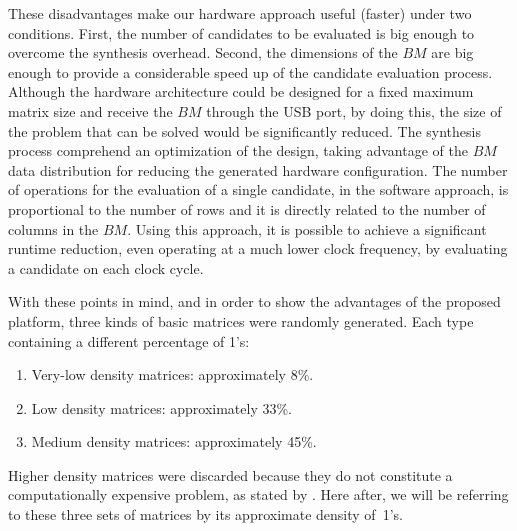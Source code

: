\documentclass[authoryear,11pt]{elsarticle}
\begin{document}
	These disadvantages make our hardware approach useful (faster) under two conditions. First, the number of 
	candidates to be evaluated is big enough to overcome the synthesis overhead. Second, the dimensions of the 
	$BM$ are big enough to provide a considerable speed up of the candidate evaluation process. Although 
	the hardware architecture could be designed for a fixed maximum matrix size and receive the $BM$ through the 
	USB port, by doing this, the size of the problem that can be solved would be significantly reduced. The 
	synthesis process comprehend an optimization of the design, taking advantage of the $BM$ data distribution for 
	reducing the generated hardware configuration. The number of operations for the evaluation of a single 
	candidate, in the software approach, is proportional to the number of rows and it is directly related to the 
	number of columns in the $BM$. Using this approach, it is possible to achieve a significant runtime reduction,
	even operating at a much lower clock frequency, by evaluating a candidate on each clock cycle.
	
	With these points in mind, and in order to show the advantages of the proposed platform, 
	three kinds of basic matrices were randomly generated. Each type containing a different percentage of 1's: 
	\begin{enumerate}
		\item Very-low density matrices: approximately 8\%.
		\item Low density matrices: approximately 33\%.
		\item Medium density matrices: approximately 45\%.
	\end{enumerate}
	
	Higher density matrices were discarded because they do not constitute a computationally expensive problem, 
	as stated by \cite{Rojas12}. Here after, we will be referring to these three sets of matrices by its 
	approximate density of~1's.
	
\end{document}

